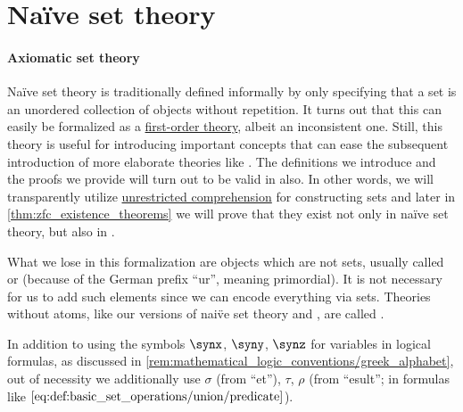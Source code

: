 \section{Na\"ive set theory}\label{sec:naive_set_theory}

\paragraph{Axiomatic set theory}

Na\"ive set theory is traditionally defined informally by only specifying that a set is an unordered collection of objects without repetition. It turns out that this can easily be formalized as a \hyperref[def:first_order_theory]{first-order theory}, albeit an inconsistent one. Still, this theory is useful for introducing important concepts that can ease the subsequent introduction of more elaborate theories like \hyperref[def:zfc]{}. The definitions we introduce and the proofs we provide will turn out to be valid in  also. In other words, we will transparently utilize \hyperref[def:naive_set_theory/unrestricted_comprehension]{unrestricted comprehension} for constructing sets and later in \cref{thm:zfc_existence_theorems} we will prove that they exist not only in na\"ive set theory, but also in .

\begin{remark}\label{rem:pure_set_theory}
  What we lose in this formalization are objects which are not sets, usually called  or  (because of the German prefix \enquote{ur}, meaning primordial). It is not necessary for us to add such elements since we can encode everything via sets. Theories without atoms, like our versions of nai\"ve set theory and \hyperref[def:axiom_of_universes]{}, are called .
\end{remark}

\begin{remark}\label{rem:set_theory_formula_variables}
  In addition to using the symbols \( \synx \), \( \syny \), \( \synz \) for variables in logical formulas, as discussed in \cref{rem:mathematical_logic_conventions/greek_alphabet}, out of necessity we additionally use \( \sigma \) (from \enquote{et}), \( \tau \), \( \rho \) (from \enquote{esult}; in formulas like \( \ref{eq:def:basic_set_operations/union/predicate} \)).
\end{remark}

